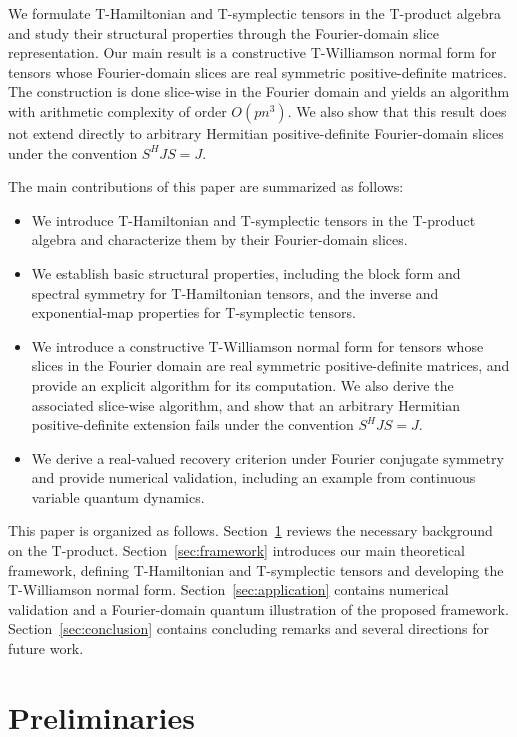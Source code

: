 \documentclass[pdflatex,sn-mathphys-ay]{sn-jnl}
\theoremstyle{thmstyleone}
\theoremstyle{thmstyletwo}
\theoremstyle{thmstylethree}
\numberwithin{equation}{section}
\begin{document}
We formulate T-Hamiltonian and T-symplectic tensors in the T-product algebra and study their structural properties through the Fourier-domain slice representation. 
Our main result is a constructive T-Williamson normal form for tensors whose Fourier-domain slices are real symmetric positive-definite matrices. 
The construction is done slice-wise in the Fourier domain and yields an algorithm with arithmetic complexity of order $O(pn^3)$.
We also show that this result does not extend directly
to arbitrary Hermitian positive-definite Fourier-domain slices under the convention $S^HJS = J$.

The main contributions of this paper are summarized as follows:
\begin{itemize}
    \item We introduce T-Hamiltonian and T-symplectic tensors in the T-product algebra and characterize them by their Fourier-domain slices.
    \item We establish basic structural properties, including the block form and spectral symmetry for T-Hamiltonian tensors, and the inverse and exponential-map properties for T-symplectic tensors.
    \item We introduce a constructive T-Williamson normal form for tensors whose slices in the Fourier domain  are real symmetric positive-definite matrices, and provide an explicit algorithm for its computation. We also derive the associated slice-wise algorithm, and show that an arbitrary Hermitian positive-definite extension fails under the convention $S^H JS = J$.
    \item We derive a real-valued recovery criterion under Fourier conjugate symmetry and provide numerical validation, including an  example from continuous variable quantum dynamics.
\end{itemize}

This paper is organized as follows. 
Section~\ref{sec:prelim} reviews the necessary background on the T-product. 
Section~\ref{sec:framework} introduces our main theoretical framework, defining T-Hamiltonian and T-symplectic tensors and developing the T-Williamson normal form. 
Section~\ref{sec:application} contains numerical validation and a Fourier-domain quantum illustration of the proposed framework. 
Section~\ref{sec:conclusion} contains concluding remarks and several directions for future work.

\section{Preliminaries}
\label{sec:prelim}
\end{document}
